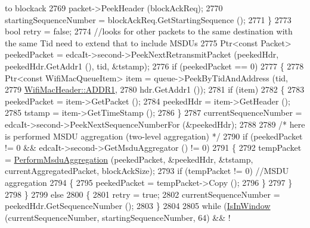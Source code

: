 \begin{DoxyCode}
{       to blockack}
2769                   packet->PeekHeader (blockAckReq);
2770                   startingSequenceNumber = blockAckReq.GetStartingSequence ();
2771                 \}
2773               \textcolor{keywordtype}{bool} retry = \textcolor{keyword}{false};
2774               \textcolor{comment}{//looks for other packets to the same destination with the same Tid need to extend that to
       include MSDUs}
2775               Ptr<const Packet> peekedPacket = edcaIt->second->PeekNextRetransmitPacket (peekedHdr, 
      peekedHdr.GetAddr1 (), tid, &tstamp);
2776               \textcolor{keywordflow}{if} (peekedPacket == 0)
2777                 \{
2778                   Ptr<const WifiMacQueueItem> item = queue->PeekByTidAndAddress (tid,
2779                                                                                  
      \hyperlink{classns3_1_1WifiMacHeader_a17406db48973a8e8fb6d961dd35154fea8ff9765c77ab96f3bbc7385ece3d00bf}{WifiMacHeader::ADDR1},
2780                                                                                  hdr.GetAddr1 ());
2781                   \textcolor{keywordflow}{if} (item)
2782                     \{
2783                       peekedPacket = item->GetPacket ();
2784                       peekedHdr = item->GetHeader ();
2785                       tstamp = item->GetTimeStamp ();
2786                     \}
2787                   currentSequenceNumber = edcaIt->second->PeekNextSequenceNumberFor (&peekedHdr);
2788 
2789                   \textcolor{comment}{/* here is performed MSDU aggregation (two-level aggregation) */}
2790                   \textcolor{keywordflow}{if} (peekedPacket != 0 && edcaIt->second->GetMsduAggregator () != 0)
2791                     \{
2792                       tempPacket = \hyperlink{classns3_1_1MacLow_aabd112b43fd3be901c743b21d41f787f}{PerformMsduAggregation} (peekedPacket, &peekedHdr, 
      &tstamp, currentAggregatedPacket, blockAckSize);
2793                       \textcolor{keywordflow}{if} (tempPacket != 0)  \textcolor{comment}{//MSDU aggregation}
2794                         \{
2795                           peekedPacket = tempPacket->Copy ();
2796                         \}
2797                     \}
2798                 \}
2799               \textcolor{keywordflow}{else}
2800                 \{
2801                   retry = \textcolor{keyword}{true};
2802                   currentSequenceNumber = peekedHdr.GetSequenceNumber ();
2803                 \}
2804 
2805               \textcolor{keywordflow}{while} (\hyperlink{classns3_1_1MacLow_a442078ddeb869fa7e76f35f32e0533c2}{IsInWindow} (currentSequenceNumber, startingSequenceNumber, 64) && !

\end{DoxyCode}
